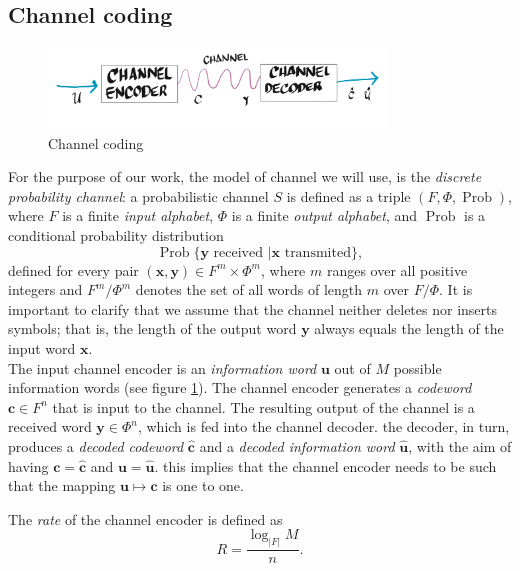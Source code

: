 \subsection{Channel coding}
\begin{figure}[H]
\centering
\includegraphics[width=0.8\textwidth]{Figures/Channel_decoder.png}
\caption{Channel coding}
\label{CH2:Channel_communication_2}
\end{figure}
For the purpose of our work, the model of channel we will use, is the \textit{discrete probability channel}: a probabilistic channel $S$ is defined as a triple $(F,\Phi,\operatorname{Prob})$, where $F$ is a finite \textit{input alphabet}, $\Phi$ is a finite \textit{output alphabet}, and $\operatorname{Prob}$ is a conditional probability distribution
\begin{equation}
\operatorname{Prob}\{\mathbf{y}\text{ received }|\mathbf{x}\text{ transmited}\},
\end{equation}
defined for every pair $(\mathbf{x},\mathbf{y})\in F^{m}\times\Phi^m$, where $m$ ranges over all positive integers and $F^m/\Phi^m$ denotes the set of all words of length $m$ over $F/\Phi$. It is important to clarify that we assume that the channel neither deletes nor inserts symbols; that is, the length of the output word $\mathbf{y}$ always equals the length of the input word $\mathbf{x}$.\\
\indent The input channel encoder is an \textit{information word} $\mathbf{u}$ out of $M$ possible information words (see figure \ref{CH2:Channel_communication_2}). The channel encoder generates a \textit{codeword} $\mathbf{c}\in F^n$ that is input to the channel. The resulting output of the channel is a received word $\mathbf{y}\in\Phi^n$, which is fed into the channel decoder. the decoder, in turn, produces a \textit{decoded codeword} $\hat{\mathbf{c}}$ and a \textit{decoded information word} $\hat{\mathbf{u}}$, with the aim of having $\mathbf{c}=\hat{\mathbf{c}}$ and $\mathbf{u}=\hat{\mathbf{u}}$. this implies that the channel encoder needs to be such that the mapping $\mathbf{u}\mapsto \mathbf{c}$ is one to one.
\begin{definition}[Rate]
The \textit{rate} of the channel encoder is defined as 
\begin{equation}
R = \frac{\log_{|F|}M}{n}.
\end{equation}
\end{definition}
